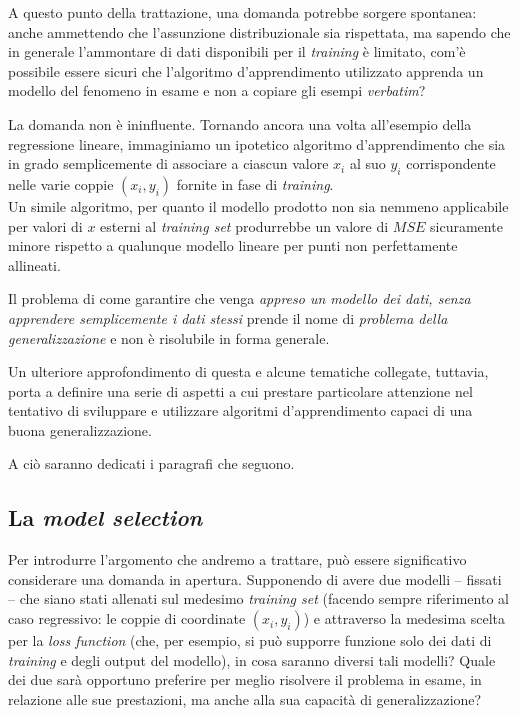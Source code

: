 \documentclass[a4paper, twoside]{article}
\begin{document}
A questo punto della trattazione, una domanda potrebbe sorgere spontanea: anche ammettendo che l'assunzione distribuzionale sia rispettata, ma sapendo che in generale l'ammontare di dati disponibili per il \textit{training} è limitato, com'è possibile essere sicuri che l'algoritmo d'apprendimento utilizzato apprenda un modello del fenomeno in esame e non a copiare gli esempi \textit{verbatim}?

La domanda non è ininfluente. Tornando ancora una volta all'esempio della regressione lineare, immaginiamo un ipotetico algoritmo d'apprendimento che sia in grado semplicemente di associare a ciascun valore $x_i$ al suo $y_i$ corrispondente nelle varie coppie $(x_i, y_i)$ fornite in fase di \textit{training}.\\
Un simile algoritmo, per quanto il modello prodotto non sia nemmeno applicabile per valori di $x$ esterni al \textit{training set} produrrebbe un valore di $MSE$ sicuramente minore rispetto a qualunque modello lineare per punti non perfettamente allineati.

Il problema di come garantire che venga \textit{appreso un modello dei dati, senza apprendere semplicemente i dati stessi} prende il nome di \textit{problema della generalizzazione} e non è risolubile in forma generale.

Un ulteriore approfondimento di questa e alcune tematiche collegate, tuttavia, porta a definire una serie di aspetti a cui prestare particolare attenzione nel tentativo di sviluppare e utilizzare algoritmi d'apprendimento capaci di una buona generalizzazione.

A ciò saranno dedicati i paragrafi che seguono.


\subsection{La \textit{model selection}}

Per introdurre l'argomento che andremo a trattare, può essere significativo considerare una domanda in apertura. Supponendo di avere due modelli -- fissati -- che siano stati allenati sul medesimo \textit{training set} (facendo sempre riferimento al caso regressivo: le coppie di coordinate $(x_i, y_i)$) e attraverso la medesima scelta per la \textit{loss function} (che, per esempio, si può supporre funzione solo dei dati di \textit{training} e degli output del modello), in cosa saranno diversi tali modelli? Quale dei due sarà opportuno preferire per meglio risolvere il problema in esame, in relazione alle sue prestazioni, ma anche alla sua capacità di generalizzazione?
\end{document}
